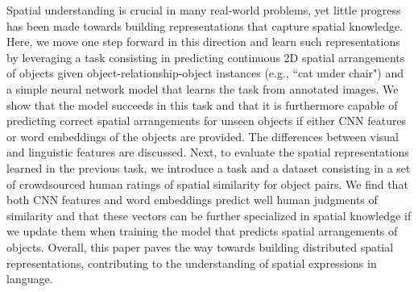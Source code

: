 Spatial understanding is crucial in many real-world problems, yet little progress has been made towards building representations that capture spatial knowledge. Here, we move one step forward in this direction and learn such representations by leveraging a task consisting in predicting continuous 2D spatial arrangements of objects given object-relationship-object instances (e.g., ``cat under chair") and a simple neural network model that learns the task from annotated images. We show that the model succeeds in this task and that it is furthermore capable of predicting correct spatial arrangements for unseen objects if either CNN features or word embeddings of the objects are provided. The differences between visual and linguistic features are discussed. Next, to evaluate the spatial representations learned in the previous task, we introduce a task and a dataset consisting in a set of crowdsourced human ratings of spatial similarity for object pairs. We find that both CNN features and word embeddings predict well human judgments of similarity and that these vectors can be further specialized in spatial knowledge if we update them when training the model that predicts spatial arrangements of objects. Overall, this paper paves the way towards building distributed spatial representations, contributing to the understanding of spatial expressions in language.